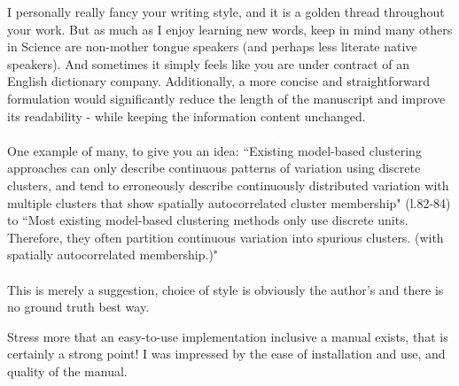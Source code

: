 \begin{point}{}
    I personally really fancy your writing style, 
and it is a golden thread throughout your work.  
But as much as I enjoy learning new words, 
keep in mind many others in Science are non-mother tongue speakers 
(and perhaps less literate native speakers). 
And sometimes it simply feels like you are under contract of an English dictionary company.
Additionally, a more concise and straightforward formulation 
would significantly reduce the length of the manuscript and improve its readability 
- while keeping the information content unchanged. 
\\\\
One example of many, to give you an idea:
``Existing model-based clustering approaches can only describe 
continuous patterns of variation using discrete clusters,
and tend to erroneously describe continuously distributed variation 
with multiple clusters that show spatially autocorrelated cluster membership" (l.82-84)
to 
``Most existing model-based clustering methods only use discrete units. 
Therefore, they often partition continuous variation into spurious clusters. 
(with spatially autocorrelated membership.)"
\\\\
This is merely a suggestion, choice of style is obviously the author's and there is
no ground truth best way.
\end{point}


\begin{point}{}
    Stress more that an easy-to-use implementation inclusive a manual exists, that is
certainly a strong point! I was impressed by the ease of installation and use, and quality of the manual.
\end{point}

